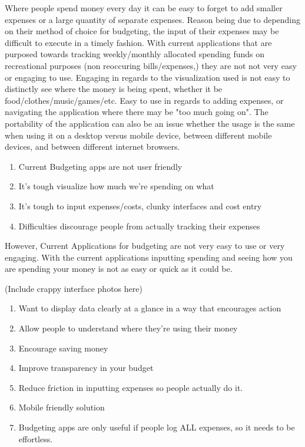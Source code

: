 \documentclass{chi2011}
\begin{document}
Where people spend money every day it can be easy to forget to add smaller expenses or a large quantity of separate 
expenses. Reason being due to depending on their method of choice for budgeting, the input of their expenses may be 
difficult to execute in a timely fashion. With current applications that are purposed towards tracking 
weekly/monthly allocated spending funds on recreational purposes (non reoccuring bills/expenses,) they are not not 
very easy or engaging to use. Engaging in regards to the visualization used is not easy to distinctly see where the 
money is being spent, whether it be food/clothes/music/games/etc. Easy to use in regards to adding expenses, or navigating 
the application where there may be "too much going on". The portability of the application can also be an issue whether the 
usage is the same when using it on a desktop versus mobile device, between different mobile devices, and between different 
internet browsers. 



\begin{enumerate}
    \item Current Budgeting apps are not user friendly
    \item It's tough visualize how much we're spending on what
    \item It's tough to input expenses/costs, clunky interfaces and cost entry
    \item Difficulties discourage people from actually tracking their expenses
\end{enumerate}
 However, Current Applications for budgeting are not very easy to use or very
 engaging. With the current applications inputting spending and seeing how you
 are spending your money is not as easy or quick as it could be.  

(Include crappy interface photos here)

\begin{enumerate}
\item Want to display data clearly at a glance in a way that encourages action
\item Allow people to understand where they're using their money
\item Encourage saving money
\item Improve transparency in your budget
\item Reduce friction in inputting expenses so people actually do it.
\item Mobile friendly solution
\item Budgeting apps are only useful if people log ALL expenses, so it needs to be effortless.
\end{enumerate}
\end{document}
